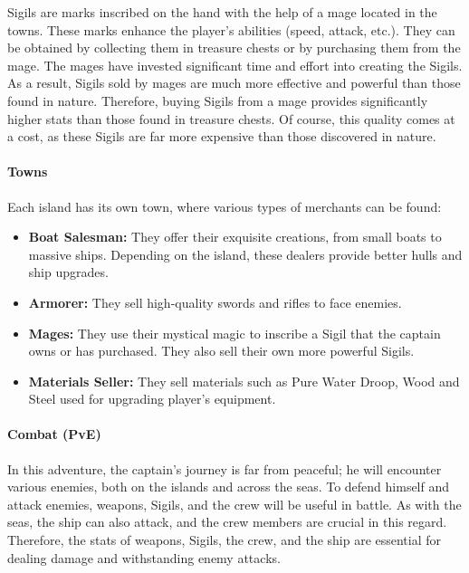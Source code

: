 \documentclass{article}
\begin{document}
Sigils are marks inscribed on the hand with the help of a mage located in the towns. These marks enhance the player's abilities (speed, attack, etc.). They can be obtained by collecting them in treasure chests or by purchasing them from the mage. The mages have invested significant time and effort into creating the Sigils. As a result, Sigils sold by mages are much more effective and powerful than those found in nature. Therefore, buying Sigils from a mage provides significantly higher stats than those found in treasure chests. Of course, this quality comes at a cost, as these Sigils are far more expensive than those discovered in nature.

\paragraph{Towns}\hfill

Each island has its own town, where various types of merchants can be found:
\begin{itemize}
    \item \textbf{Boat Salesman:} They offer their exquisite creations, from small boats to massive ships. Depending on the island, these dealers provide better hulls and ship upgrades.
    \item \textbf{Armorer:} They sell high-quality swords and rifles to face enemies.
    \item \textbf{Mages:} They use their mystical magic to inscribe a Sigil that the captain owns or has purchased. They also sell their own more powerful Sigils.
    \item \textbf{Materials Seller:} They sell materials such as Pure Water Droop, Wood and Steel used for upgrading player's equipment.
\end{itemize}

\paragraph{Combat (PvE)}\hfill

In this adventure, the captain's journey is far from peaceful; he will encounter various enemies, both on the islands and across the seas. To defend himself and attack enemies, weapons, Sigils, and the crew will be useful in battle. As with the seas, the ship can also attack, and the crew members are crucial in this regard. Therefore, the stats of weapons, Sigils, the crew, and the ship are essential for dealing damage and withstanding enemy attacks.
\end{document}
